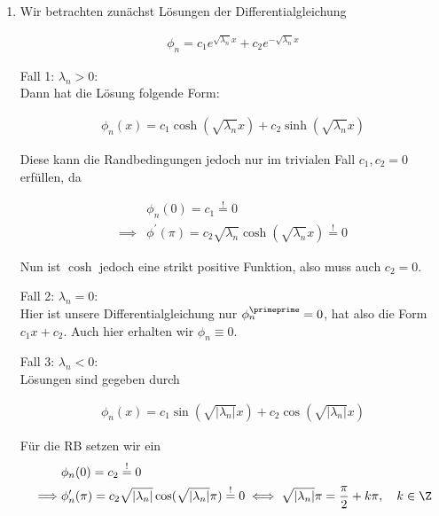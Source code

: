 
\begin{solution}
\begin{enumerate}[label = (\roman*)]
  \item Wir betrachten zunächst Lösungen der Differentialgleichung

  \begin{align*}
    \phi_n
    =
    c_1 e^{\sqrt{\lambda_n}x} + c_2 e^{-\sqrt{\lambda_n}x}
  \end{align*}

  Fall 1: $\lambda_n > 0$: \\
  Dann hat die Lösung folgende Form:

  \begin{align*}
    \phi_n(x)
    =
    c_1 \cosh(\sqrt{\lambda_n}x) + c_2 \sinh(\sqrt{\lambda_n}x)
  \end{align*}

  Diese kann die Randbedingungen jedoch nur im trivialen Fall $c_1, c_2 = 0$ erfüllen, da

  \begin{align*}
    &\phi_n(0) = c_1 \stackrel{!}{=} 0\\
    \implies
    &\phi^\prime(\pi) = c_2 \sqrt{\lambda_n} \cosh({\sqrt{\lambda_n}x}) \stackrel{!}{=} 0
  \end{align*}

  Nun ist $\cosh$ jedoch eine strikt positive Funktion, also muss auch $c_2 = 0$.

  Fall 2: $\lambda_n = 0$: \\
  Hier ist unsere Differentialgleichung nur $\phi_n^\primeprime = 0$, hat also die Form $c_1 x + c_2$. Auch hier erhalten wir $\phi_n \equiv 0$.

  Fall 3: $\lambda_n < 0$: \\
  Lösungen sind gegeben durch

  \begin{align*}
    \phi_n(x) = c_1 \sin(\sqrt{|\lambda_n|}x) + c_2 \cos(\sqrt{|\lambda_n|}x)
  \end{align*}

  Für die RB setzen wir ein
  \begin{align*}
    &\phi_n(0) = c_2 \stackrel{!}{=}0 \\
    \implies
    &\phi_n^\prime(\pi) = c_2 \sqrt{|\lambda_n|} \cos({\sqrt{|\lambda_n|}\pi}) \stackrel{!}{=} 0
    \iff
    \sqrt{|\lambda_n|}\pi = \frac{\pi}{2} + k\pi, \quad k \in \Z
  \end{align*}


\end{enumerate}
\end{solution}
